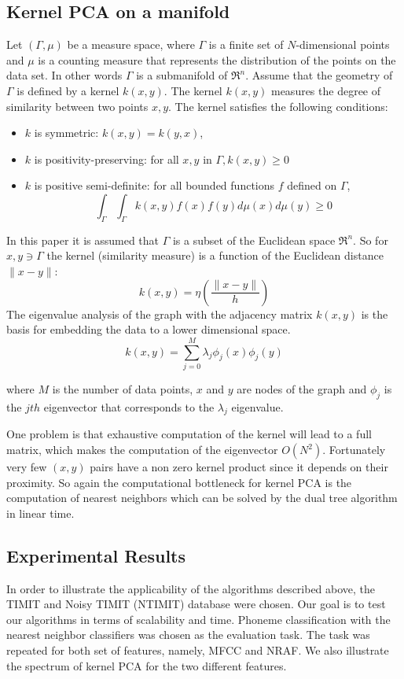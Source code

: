 \documentclass[12pt,letterpaper,doublespaced,ETD,dvips,proposal]{gtthesis}
\begin{document}
\begin{Body}
\subsection{Kernel PCA on a manifold} Let  $(\Gamma,\mu)$ be a
measure space, where $\Gamma$ is a finite set of $N$-dimensional
points and $\mu$ is a counting measure that represents the
distribution of the points on the data set. In other words $\Gamma$
is a submanifold of $\Re^{n}$. Assume that the geometry of $\Gamma$
is defined by a kernel $k(x,y)$. The kernel $k(x,y)$ measures the
degree of similarity between two points $x,y$. The kernel satisfies
the following conditions:
\begin{itemize}
    \item   $k$ is symmetric: $k(x,y)=k(y,x)$,
    \item   $k$ is positivity-preserving: for all $x,y$ in
$\Gamma, k(x,y)\geq 0$
    \item   $k$ is positive semi-definite: for all bounded
functions $f$ defined on  $\Gamma$,
\[
\int_{\Gamma} \int_{\Gamma} k(x,y)f(x)f(y)d\mu(x)d\mu(y)\geq 0\]
\end{itemize}
In this paper it is assumed that $\Gamma$ is a subset of the
Euclidean space $\Re^{n}$. So for $x,y\ni\Gamma$ the kernel
(similarity measure) is a function of the Euclidean distance
$\parallel x-y\parallel:$
\[
 k(x,y)=\eta(\frac{\parallel x-y\parallel}{h})
\]
The eigenvalue analysis of the graph with the adjacency matrix
$k(x,y)$ is the basis for embedding the data to a lower dimensional
space.
\[
    k(x,y)=\sum_{j=0}^{M} \lambda_{j}\phi_{j}(x)\phi_{j}(y)
\]

where $M$ is the number of data points, $x$ and $y$ are nodes of the
graph and $\phi_j$ is the $jth$ eigenvector that corresponds to the
$\lambda_j$ eigenvalue.

One problem is that exhaustive computation of the kernel will lead
to a full matrix, which makes the computation of the eigenvector
$O(N^2)$. Fortunately very few $(x,y)$ pairs have a non zero kernel
product since it depends on their proximity. So again the
computational bottleneck for kernel PCA is the computation of
nearest neighbors which can be solved by the dual tree algorithm in
linear time.

\subsection{Experimental Results} In order to illustrate the
applicability of the algorithms described above, the TIMIT and Noisy
TIMIT (NTIMIT) database were chosen. Our goal is to test our
algorithms in terms of scalability and time. Phoneme classification
with the nearest neighbor classifiers was chosen as the evaluation
task. The task was repeated for both set of features, namely, MFCC
and NRAF. We also illustrate the spectrum of kernel PCA for the two
different features.

\end{Body}
\end{document}
